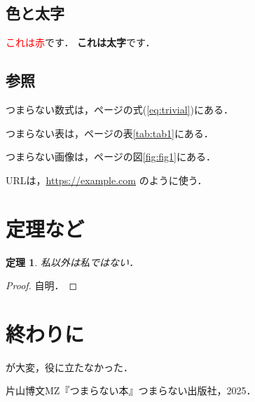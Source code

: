 \documentclass[a4paper,11pt,twocolumn]{ltjsarticle} %
\newcommand{\mathref}[1]{(\ref{#1})} %
\newtheorem{thm}{定理}
\begin{document}
\subsection{色と太字}

\textcolor{red}{これは赤}です．
\textbf{これは太字}です．

\subsection{参照}

つまらない数式は，\pageref{eq:trivial}ページの式\mathref{eq:trivial}にある．

つまらない表は，\pageref{tab:tab1}ページの表\ref{tab:tab1}にある．

つまらない画像は，\pageref{fig:fig1}ページの図\ref{fig:fig1}にある．

URLは，\url{https://example.com} のように使う．

\section{定理など}

\begin{thm} %
私以外は私ではない．
\end{thm}

\begin{proof} %
自明．
\end{proof}

\section{終わりに}

\cite{bib:mybook}が大変，役に立たなかった．

\begin{thebibliography}{99}
	片山博文MZ『つまらない本』つまらない出版社，2025．
\end{thebibliography}
\end{document}
